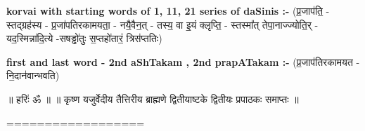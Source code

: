 \documentclass[17pt]{extarticle}
\begin{document}
        \textbf{korvai with starting words of 1, 11, 21 series of daSinis :-} \newline
        (प्र॒जाप॑ति॒ - स्तद्ग्रह॑स्य - प्र॒जा॑पतिरकामयता॒ - नयै॒वैन॒त् - तस्य॒ वा इ॒यं क्लृप्ति॒ - स्तस्मा᳚त् तेपा॒नाज्ज्योति॒र् - यद॒स्मिन्ना॑दि॒त्ये -सषड्ढो॑तुः स॒प्तहो॑तारं॒ त्रिस॑प्ततिः) \newline

        \textbf{first and last  word - 2nd aShTakam , 2nd prapATakam :-} \newline
        (प्र॒जाप॑तिरकामयत - नि॒दान॑वान्भवति) \newline 

       

        ॥ हरिः॑ ॐ ॥
॥ कृष्ण यजुर्वेदीय तैत्तिरीय ब्राह्मणे द्वितीयाष्टके द्वितीयः प्रपाठकः समाप्तः ॥

================== \newline
        \pagebreak
        
        
        
\end{document}
